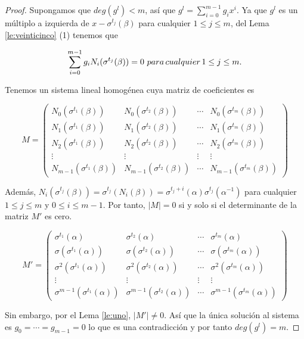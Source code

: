\begin{proof}
    Supongamos que $deg(g^l) < m$, así que $g^l = \sum_{i=0}^{m-1} g_ix^i$. Ya que $g^l$ es un múltiplo a izquierda de $x-\sigma^{t_j}(\beta)$ para cualquier $1 \leq j \leq m$, del Lema \ref{le:veinticinco} (1) tenemos que

    \[ \sum_{i=0}^{m-1} g_iN_i(\sigma^{t_j}(\beta)) = 0 \thinspace \thinspace para \thinspace cualquier \thinspace 1 \leq j \leq m.\]

Tenemos un sistema lineal homogénea cuya matriz de coeficientes es

\[  M =  \left( \begin{array}{cccc}
	N_0(\sigma^{t_1}(\beta)) & N_0(\sigma^{t_2}(\beta)) & \cdots & N_0(\sigma^{t_m}(\beta))  \\
	N_1(\sigma^{t_1}(\beta)) & N_1(\sigma^{t_2}(\beta)) & \cdots & N_1(\sigma^{t_m}(\beta))  \\
    N_2(\sigma^{t_1}(\beta)) & N_2(\sigma^{t_2}(\beta)) & \cdots &  N_2(\sigma^{t_m}(\beta))  \\
    \vdots & \vdots  & \vdots & \vdots  \\
	N_{m-1}(\sigma^{t_1}(\beta)) & N_{m-1}(\sigma^{t_2}(\beta)) & \cdots & N_{m-1}(\sigma^{t_m}(\beta))
			\end{array} 
	\right) 
\]

Además, $N_i(\sigma^{t_j}(\beta)) = \sigma^{t_j}(N_i(\beta)) = \sigma^{t_j+i}(\alpha)\sigma^{t_j}(\alpha^{-1})$ para cualquier $1 \leq j \leq m$ y $ 0 \leq i \leq m-1$. Por tanto, $\mid M \mid = 0$ si y solo si el determinante de la matriz $M'$ es cero.

\[  M' =  \left( \begin{array}{cccc}
	\sigma^{t_1}(\alpha) &\sigma^{t_2}(\alpha) & \cdots & \sigma^{t_m}(\alpha)  \\
	\sigma(\sigma^{t_1}(\alpha)) & \sigma(\sigma^{t_2}(\alpha)) & \cdots &\sigma(\sigma^{t_m}(\alpha)) \\
   \sigma^2(\sigma^{t_1}(\alpha)) & \sigma^2(\sigma^{t_2}(\alpha)) & \cdots &\sigma^2(\sigma^{t_m}(\alpha)) \\
    \vdots & \vdots  & \vdots & \vdots  \\
	\sigma^{m-1}(\sigma^{t_1}(\alpha)) & \sigma^{m-1}(\sigma^{t_2}(\alpha)) & \cdots &\sigma^{m-1}(\sigma^{t_m}(\alpha)) 
			\end{array} 
	\right) 
\]

Sin embargo, por el Lema \ref{le:uno}, $\mid M' \mid \neq 0$. Así que la única solución al sistema es $g_0 = \cdots = g_{m-1} = 0$ lo que es una contradicción y por tanto $deg(g^l) = m$.
\end{proof}


